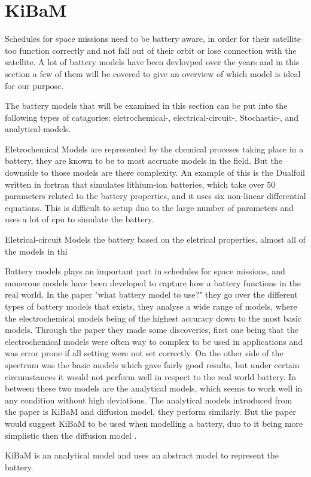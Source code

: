 \section{KiBaM}\label{sec:kibam}
Schedules for space missions need to be battery aware, in order for their satellite too function correctly and not fall out of their orbit or lose connection with the satellite. A lot of battery models have been devlovped over the years and in this section a few of them will be covered to give an overview of which model is ideal for our purpose.

The battery models that will be examined in this section can be put into the following types of catagories: eletrochemical-, electrical-circuit-, Stochastic-, and analytical-models.

Eletrochemical Models are represented by the chemical proceses taking place in a battery, they are known to be to most accruate models in the field. But the downside to those models are there complexity. An example of this is the Dualfoil written in fortran that simulates lithium-ion batteries, which take over 50 parameters related to the battery properties, and it uses six non-linear differential equations. This is difficult to setup duo to the large number of parameters and uses a lot of cpu to simulate the battery.

Eletrical-circuit Models the battery based on the eletrical properties, almost all of the models in thi




Battery models plays an important part in schedules for space missions, and numerous models have been developed to capture how a battery functions in the real world. In the paper "what battery model to use?"\cite{battery_model} they go over the different types of battery models that exists, they analyse a wide range of models, where the electrochemical models being of the highest accuracy down to the most basic models. 
Through the paper\cite{battery_model} they made some discoveries, first one being that the electrochemical models were often way to complex to be used in applications and was error prone if all setting were not set correctly. On the other side of the spectrum was the basic models which gave fairly good results, but under certain circumstances it would not perform well in respect to the real world battery. In between these two models are the analytical models, which seems to work well in any condition without high deviations. The analytical models introduced from the paper is KiBaM and diffusion model, they perform similarly. But the paper would suggest KiBaM to be used when modelling a battery, duo to it being more simplistic then the diffusion model \cite{battery_model}.

KiBaM is an analytical model and uses an abstract model to represent the battery.
